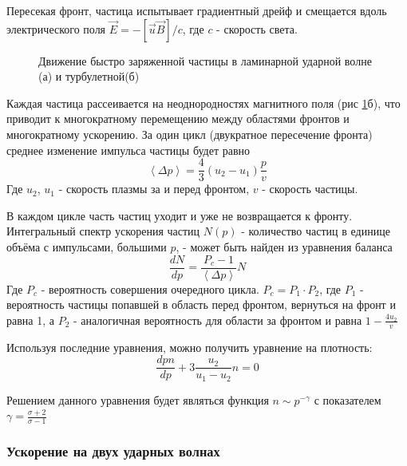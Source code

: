 \documentclass[a4paper,14pt]{extarticle} %
\begin{document}
Пересекая фронт, частица испытывает градиентный дрейф и смещается вдоль электрического поля
$\vec{E} = - [\vec{u}\vec{B}]/c$, где $c$ - скорость света.

\begin{figure}[htbp]
  \centering
  
  \caption{\label{intro/lam} Движение быстро заряженной частицы в ламинарной ударной волне (а) и турбулетной(б)}
\end{figure}
Каждая частица рассеивается на неоднородностях магнитного поля (рис \ref{intro/lam}б), что приводит к многократному перемещению между областями фронтов и многократному ускорению. За один цикл (двукратное пересечение фронта) среднее изменение импульса частицы будет равно
\begin{equation}
\left< \Delta p \right> = \frac{4}{3} (u_2-u_1)\frac{p}{v}
\end{equation}
Где $u_2$, $u_1$ - скорость плазмы за и перед фронтом, $v$ - скорость частицы.

В каждом цикле часть частиц уходит и уже не возвращается к фронту. Интегральный спектр ускорения частиц $N(p)$ - количество частиц в единице объёма с импульсами, большими $p$,  - может быть найден из уравнения баланса
\begin{equation}
\frac{dN}{dp}=\frac{P_c-1}{\left<\Delta p \right>}N
\end{equation}
Где $P_c$ - вероятность совершения очередного цикла. $P_c=P_1 \cdot P_2$, где $P_1$ - вероятность частицы попавшей в область перед фронтом, вернуться на фронт и равна 1, а $P_2$ - аналогичная вероятность для области за фронтом и равна $1-\frac{4u_2}{v}$

Используя последние уравнения, можно получить уравнение на плотность:
\begin{equation}
\frac{d pn}{dp} + 3 \frac{u_2}{u_1-u_2} n = 0
\end{equation}

Решением данного уравнения будет являться функция $n \sim p^{-\gamma}$ с показателем $\gamma=\frac{\sigma+2}{\sigma-1}$

\subsubsection{Ускорение на двух ударных волнах}
\end{document}
